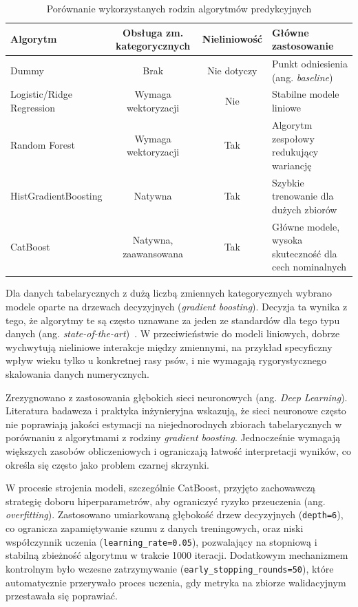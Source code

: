 \begin{table}[htbp]
\centering
\caption{Porównanie wykorzystanych rodzin algorytmów predykcyjnych}
\label{tab:algorytmy-porownanie}
\small
\begin{tabular}{|l|c|c|p{4cm}|}
\hline
\rowcolor{LightGray}
\textbf{Algorytm} & \textbf{Obsługa zm. kategorycznych} & \textbf{Nieliniowość} & \textbf{Główne zastosowanie} \\
\hline
Dummy & Brak & Nie dotyczy & Punkt odniesienia (ang. \emph{baseline}) \\
\hline
Logistic/Ridge Regression & Wymaga wektoryzacji & Nie & Stabilne modele liniowe \\
\hline
Random Forest & Wymaga wektoryzacji & Tak & Algorytm zespołowy redukujący wariancję \\
\hline
HistGradientBoosting & Natywna & Tak & Szybkie trenowanie dla dużych zbiorów \\
\hline
CatBoost & Natywna, zaawansowana & Tak & Główne modele, wysoka skuteczność dla cech nominalnych \\
\hline
\end{tabular}
\end{table}

Dla danych tabelarycznych z dużą liczbą zmiennych kategorycznych wybrano modele oparte na drzewach decyzyjnych (\emph{gradient boosting}). Decyzja ta wynika z tego, że algorytmy te są często uznawane za jeden ze standardów dla tego typu danych (ang. \emph{state-of-the-art})~\cite{Grinsztajn2022}. W przeciwieństwie do modeli liniowych, dobrze wychwytują nieliniowe interakcje między zmiennymi, na przykład specyficzny wpływ wieku tylko u konkretnej rasy psów, i nie wymagają rygorystycznego skalowania danych numerycznych.

Zrezygnowano z zastosowania głębokich sieci neuronowych (ang. \emph{Deep Learning}). Literatura badawcza i praktyka inżynieryjna wskazują, że sieci neuronowe często nie poprawiają jakości estymacji na niejednorodnych zbiorach tabelarycznych w porównaniu z algorytmami z rodziny \emph{gradient boosting}. Jednocześnie wymagają większych zasobów obliczeniowych i ograniczają łatwość interpretacji wyników, co określa się często jako problem czarnej skrzynki.

W procesie strojenia modeli, szczególnie CatBoost, przyjęto zachowawczą strategię doboru hiperparametrów, aby ograniczyć ryzyko przeuczenia (ang. \emph{overfitting}). Zastosowano umiarkowaną głębokość drzew decyzyjnych (\texttt{depth=6}), co ogranicza zapamiętywanie szumu z danych treningowych, oraz niski współczynnik uczenia (\texttt{learning\_rate=0.05}), pozwalający na stopniową i stabilną zbieżność algorytmu w trakcie 1000 iteracji. Dodatkowym mechanizmem kontrolnym było wczesne zatrzymywanie (\texttt{early\_stopping\_rounds=50}), które automatycznie przerywało proces uczenia, gdy metryka na zbiorze walidacyjnym przestawała się poprawiać.

